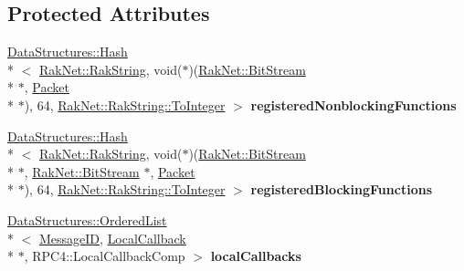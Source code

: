 \subsection*{Protected Attributes}
\begin{DoxyCompactItemize}
\item 
\hypertarget{class_rak_net_1_1_r_p_c4_a00f54b473b0fa43f8d53f4d9619677fb}{\hyperlink{class_data_structures_1_1_hash}{Data\-Structures\-::\-Hash}\\*
$<$ \hyperlink{class_rak_net_1_1_rak_string}{Rak\-Net\-::\-Rak\-String}, void($\ast$)(\hyperlink{class_rak_net_1_1_bit_stream}{Rak\-Net\-::\-Bit\-Stream} \\*
$\ast$, \hyperlink{struct_rak_net_1_1_packet}{Packet} \\*
$\ast$), 64, \hyperlink{class_rak_net_1_1_rak_string_a79f546baedf74c64a820297b40590250}{Rak\-Net\-::\-Rak\-String\-::\-To\-Integer} $>$ {\bfseries registered\-Nonblocking\-Functions}}\label{class_rak_net_1_1_r_p_c4_a00f54b473b0fa43f8d53f4d9619677fb}

\item 
\hypertarget{class_rak_net_1_1_r_p_c4_a9ab734bcb319ba8ef4a627c3ed84542c}{\hyperlink{class_data_structures_1_1_hash}{Data\-Structures\-::\-Hash}\\*
$<$ \hyperlink{class_rak_net_1_1_rak_string}{Rak\-Net\-::\-Rak\-String}, void($\ast$)(\hyperlink{class_rak_net_1_1_bit_stream}{Rak\-Net\-::\-Bit\-Stream} \\*
$\ast$, \hyperlink{class_rak_net_1_1_bit_stream}{Rak\-Net\-::\-Bit\-Stream} $\ast$, \hyperlink{struct_rak_net_1_1_packet}{Packet} \\*
$\ast$), 64, \hyperlink{class_rak_net_1_1_rak_string_a79f546baedf74c64a820297b40590250}{Rak\-Net\-::\-Rak\-String\-::\-To\-Integer} $>$ {\bfseries registered\-Blocking\-Functions}}\label{class_rak_net_1_1_r_p_c4_a9ab734bcb319ba8ef4a627c3ed84542c}

\item 
\hypertarget{class_rak_net_1_1_r_p_c4_a1a7771d9f0c01a4b1eb48e4fb1cf44b9}{\hyperlink{class_data_structures_1_1_ordered_list}{Data\-Structures\-::\-Ordered\-List}\\*
$<$ \hyperlink{namespace_rak_net_a1b2f3bf4bad2bb6a8360a12295fbed0c}{Message\-I\-D}, \hyperlink{struct_rak_net_1_1_r_p_c4_1_1_local_callback}{Local\-Callback} \\*
$\ast$, R\-P\-C4\-::\-Local\-Callback\-Comp $>$ {\bfseries local\-Callbacks}}\label{class_rak_net_1_1_r_p_c4_a1a7771d9f0c01a4b1eb48e4fb1cf44b9}


\end{DoxyCompactItemize}
